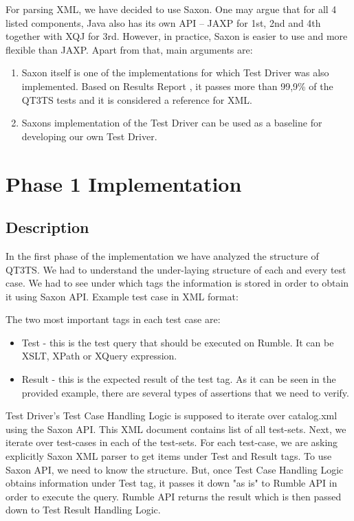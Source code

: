 For parsing XML, we have decided to use Saxon. One may argue that for all 4 listed components, Java also has its own API – JAXP for 1st, 2nd and 4th together with XQJ for 3rd. However, in practice, Saxon is easier to use and more flexible than JAXP. Apart from that, main arguments are:
\begin{enumerate}
	\item Saxon itself is one of the implementations for which Test Driver was also implemented. Based on Results Report \cite{SaxonReport}, it passes more than 99,9\% of the QT3TS tests and it is considered a reference for XML.
	\item Saxons implementation of the Test Driver can be used as a baseline for developing our own Test Driver. 
\end{enumerate}

\section{Phase 1 Implementation}
\subsection{Description}
\label{Phase1_Description}
In the first phase of the implementation we have analyzed the structure of QT3TS. We had to understand the under-laying structure of each and every test case. We had to see under which tags the information is stored in order to obtain it using Saxon API. Example test case in XML format:



The two most important tags in each test case are:
\begin{itemize}
	\item Test  - this is the test query that should be executed on Rumble. It can be XSLT, XPath or XQuery expression.
	\item Result - this is the expected result of the test tag. As it can be seen in the provided example, there are several types of assertions that we need to verify.
\end{itemize}

Test Driver's Test Case Handling Logic is supposed to iterate over catalog.xml using the Saxon API. This XML document contains list of all test-sets. Next, we iterate over test-cases in each of the test-sets. For each test-case, we are asking explicitly Saxon XML parser to get items under Test and Result tags. To use Saxon API, we need to know the structure. But, once Test Case Handling Logic obtains information under Test tag, it passes it down "as is" to Rumble API in order to execute the query. Rumble API returns the result which is then passed down to Test Result Handling Logic. 

